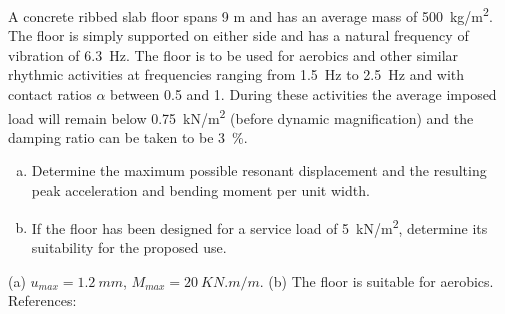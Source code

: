 
\begin{Exercise}[label={footfall_analysis}]
A concrete ribbed slab floor spans 9 m and has an average mass of \qty{500}{kg/m^2}. The floor is simply supported on either side and has a natural frequency of vibration of \qty{6.3}{Hz}. The floor is to be used for aerobics and other similar rhythmic activities at frequencies ranging from \qty{1.5}{Hz} to \qty{2.5}{Hz} and with contact ratios $\alpha$ between 0.5 and 1. During these activities the average imposed load will remain below \qty{0.75}{kN/m^2} (before dynamic magnification) and the damping ratio can be taken to be \qty{3}{\%}.

\begin{enumerate}[(a)]
    \item Determine the maximum possible resonant displacement and the resulting peak acceleration and bending moment per unit width.
    \item If the floor has been designed for a service load of \qty{5}{kN/m^2}, determine its suitability for the proposed use.
\end{enumerate}

\begin{center}
\hspace{1em}
\end{center}

\shortAnswer (a) $u_{max} = \SI{1.2}{mm}$, $M_{max} = \SI{20}{KN.m/m}$. (b) The floor is suitable for aerobics.\\
References: \cite{chopra}
\end{Exercise}



